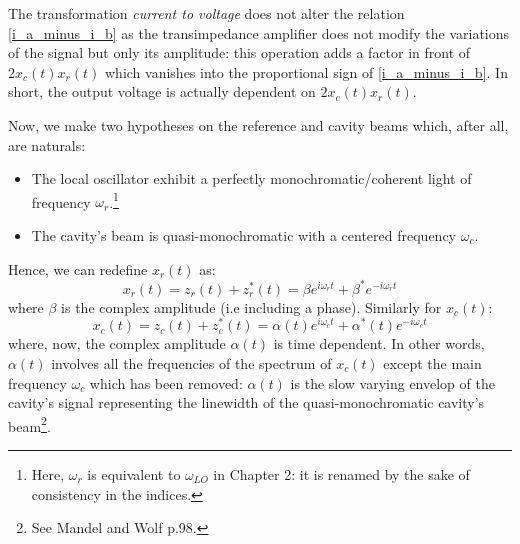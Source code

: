 \documentclass[11pt]{report}
\begin{document}
The transformation \textit{current to voltage} does not alter the relation \eqref{i_a_minus_i_b} as the transimpedance amplifier does not modify the variations of the signal but only its amplitude: this operation adds a factor in front of $2x_c(t)x_r(t)$ which vanishes into the proportional sign of \eqref{i_a_minus_i_b}. In short, the output voltage is actually dependent on $2x_c(t)x_r(t)$.

Now, we make two hypotheses on the reference and cavity beams which, after all, are naturals:
\begin{itemize}
	\item The local oscillator exhibit a perfectly monochromatic/coherent light of frequency $\omega_{r}$.\footnote{Here, $\omega_{r}$ is equivalent to $\omega_{LO}$ in Chapter 2: it is renamed by the sake of consistency in the indices.}
	\item The cavity's beam is quasi-monochromatic with a centered frequency $\omega_{c}$.
\end{itemize}
Hence, we can redefine $x_r(t)$ as:
\begin{equation}
x_r(t) = z_r(t) + z^*_r(t) = \beta e^{i\omega_{r}t} + \beta^* e^{-i\omega_{r}t}
\end{equation}
where $\beta$ is the complex amplitude (i.e including a phase). Similarly for $x_c(t)$:
\begin{equation}
x_c(t) = z_c(t) + z^*_c(t) = \alpha(t) e^{i\omega_{c}t} + \alpha^*(t) e^{-i\omega_{c}t}
\end{equation}
where, now, the complex amplitude $\alpha(t)$ is time dependent. In other words, $\alpha(t)$ involves all the frequencies of the spectrum of $x_c(t)$ except the main frequency $\omega_{c}$ which has been removed: $\alpha(t)$ is the slow varying envelop of the cavity's signal representing the linewidth of the quasi-monochromatic cavity's beam\footnote{See Mandel and Wolf p.98.}.
\end{document}
